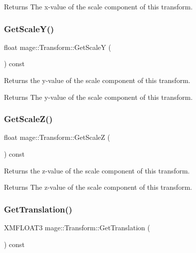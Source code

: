 \begin{DoxyReturn}{Returns}
The x-\/value of the scale component of this transform. 
\end{DoxyReturn}
\hypertarget{structmage_1_1_transform_acbd677fa7e27cb15d205ac8354d8624a}{}\label{structmage_1_1_transform_acbd677fa7e27cb15d205ac8354d8624a} 
\subsubsection{\texorpdfstring{Get\+Scale\+Y()}{GetScaleY()}}
{\footnotesize\ttfamily float mage\+::\+Transform\+::\+Get\+ScaleY (\begin{DoxyParamCaption}{ }\end{DoxyParamCaption}) const}

Returns the y-\/value of the scale component of this transform.

\begin{DoxyReturn}{Returns}
The y-\/value of the scale component of this transform. 
\end{DoxyReturn}
\hypertarget{structmage_1_1_transform_a9e8f3a4ec330e6f4c9e1a9607daf30fa}{}\label{structmage_1_1_transform_a9e8f3a4ec330e6f4c9e1a9607daf30fa} 
\subsubsection{\texorpdfstring{Get\+Scale\+Z()}{GetScaleZ()}}
{\footnotesize\ttfamily float mage\+::\+Transform\+::\+Get\+ScaleZ (\begin{DoxyParamCaption}{ }\end{DoxyParamCaption}) const}

Returns the z-\/value of the scale component of this transform.

\begin{DoxyReturn}{Returns}
The z-\/value of the scale component of this transform. 
\end{DoxyReturn}
\hypertarget{structmage_1_1_transform_aca74308060f244adf137676e79a9f6e5}{}\label{structmage_1_1_transform_aca74308060f244adf137676e79a9f6e5} 
\subsubsection{\texorpdfstring{Get\+Translation()}{GetTranslation()}}
{\footnotesize\ttfamily X\+M\+F\+L\+O\+A\+T3 mage\+::\+Transform\+::\+Get\+Translation (\begin{DoxyParamCaption}{ }\end{DoxyParamCaption}) const}

